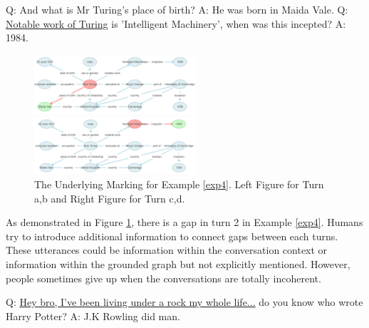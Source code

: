 \documentclass[bsc,frontabs,twoside,singlespacing,parskip,deptreport]{infthesis}     %
\begin{document}
\begin{exe}
	\ex
	\label{exp4}

		\begin{xlist}
			\ex \label{exp2q1} Q: And what is Mr Turing's place of birth?
			\ex \label{exp2a1} A: He was born in Maida Vale.
			\ex \label{exp2q2} Q: \underline{Notable work of Turing} is 'Intelligent Machinery', when was this incepted?
			\ex \label{exp2a2} A: 1984.
	\end{xlist}
\end{exe}


\begin{figure}[htbp]
\centering
\begin{minipage}[t]{0.48\textwidth}
\centering
\includegraphics[width=6cm]{alandis2t1.png}
\end{minipage}
\begin{minipage}[t]{0.48\textwidth}
\centering
\includegraphics[width=6cm]{alandis2t2.png}
\end{minipage}
\caption{The Underlying Marking for Example \ref{exp4}. Left Figure for Turn a,b and Right Figure for Turn c,d.}
\label{fig:exp4fig}
\end{figure}

As demonstrated in Figure \ref{fig:exp4fig}, there is a gap in turn 2 in Example \ref{exp4}. Humans try to introduce additional information to connect gaps between each turns. These utterances could be information within the conversation context or information within the grounded graph but not explicitly mentioned. However, people sometimes give up when the conversations are totally incoherent.


\begin{exe}
	\ex
	\label{exp5}
		\begin{xlist}
			\ex \label{exp3q1} Q: \underline{Hey bro, I've been living under a rock my whole life...} do you know who wrote Harry Potter?
			\ex \label{exp3a1} A: J.K Rowling did man.
	\end{xlist}
\end{exe}
\end{document}
